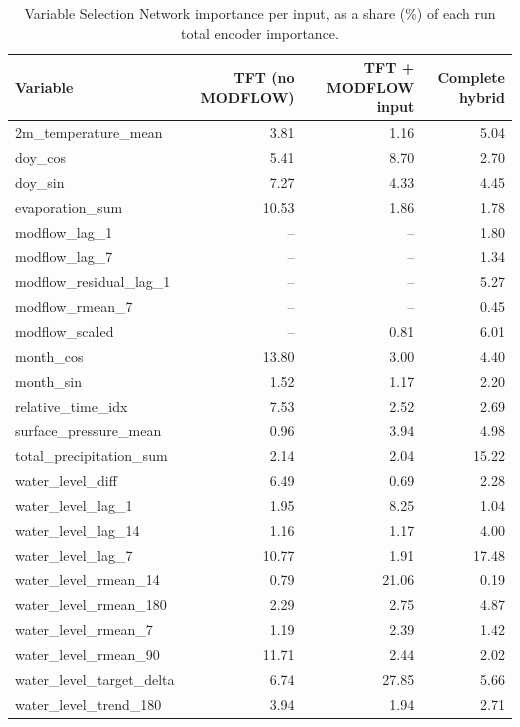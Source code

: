 \begin{table}[htbp]
\centering
\caption{Variable Selection Network importance per input, as a share (\%) of each run total encoder importance.}
\label{tab:vsn_variables}
\begin{tabular}{lrrr}
\hline
Variable & TFT (no MODFLOW) & TFT + MODFLOW input & Complete hybrid \\
\hline
2m\_temperature\_mean & 3.81 & 1.16 & 5.04 \\
doy\_cos & 5.41 & 8.70 & 2.70 \\
doy\_sin & 7.27 & 4.33 & 4.45 \\
evaporation\_sum & 10.53 & 1.86 & 1.78 \\
modflow\_lag\_1 & -- & -- & 1.80 \\
modflow\_lag\_7 & -- & -- & 1.34 \\
modflow\_residual\_lag\_1 & -- & -- & 5.27 \\
modflow\_rmean\_7 & -- & -- & 0.45 \\
modflow\_scaled & -- & 0.81 & 6.01 \\
month\_cos & 13.80 & 3.00 & 4.40 \\
month\_sin & 1.52 & 1.17 & 2.20 \\
relative\_time\_idx & 7.53 & 2.52 & 2.69 \\
surface\_pressure\_mean & 0.96 & 3.94 & 4.98 \\
total\_precipitation\_sum & 2.14 & 2.04 & 15.22 \\
water\_level\_diff & 6.49 & 0.69 & 2.28 \\
water\_level\_lag\_1 & 1.95 & 8.25 & 1.04 \\
water\_level\_lag\_14 & 1.16 & 1.17 & 4.00 \\
water\_level\_lag\_7 & 10.77 & 1.91 & 17.48 \\
water\_level\_rmean\_14 & 0.79 & 21.06 & 0.19 \\
water\_level\_rmean\_180 & 2.29 & 2.75 & 4.87 \\
water\_level\_rmean\_7 & 1.19 & 2.39 & 1.42 \\
water\_level\_rmean\_90 & 11.71 & 2.44 & 2.02 \\
water\_level\_target\_delta & 6.74 & 27.85 & 5.66 \\
water\_level\_trend\_180 & 3.94 & 1.94 & 2.71 \\
\hline
\end{tabular}
\end{table}